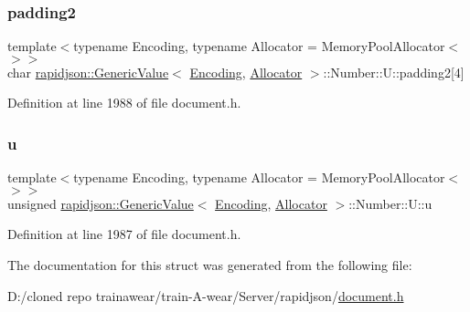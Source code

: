 \subsubsection{\texorpdfstring{padding2}{padding2}}
{\footnotesize\ttfamily template$<$typename Encoding, typename Allocator = Memory\+Pool\+Allocator$<$$>$$>$ \\
char \mbox{\hyperlink{classrapidjson_1_1_generic_value}{rapidjson\+::\+Generic\+Value}}$<$ \mbox{\hyperlink{classrapidjson_1_1_encoding}{Encoding}}, \mbox{\hyperlink{classrapidjson_1_1_allocator}{Allocator}} $>$\+::Number\+::\+U\+::padding2\mbox{[}4\mbox{]}}



Definition at line 1988 of file document.\+h.

\mbox{\label{structrapidjson_1_1_generic_value_1_1_number_1_1_u_aa624c2fe538411dd515dcfb0d72472b1}} 
\subsubsection{\texorpdfstring{u}{u}}
{\footnotesize\ttfamily template$<$typename Encoding, typename Allocator = Memory\+Pool\+Allocator$<$$>$$>$ \\
unsigned \mbox{\hyperlink{classrapidjson_1_1_generic_value}{rapidjson\+::\+Generic\+Value}}$<$ \mbox{\hyperlink{classrapidjson_1_1_encoding}{Encoding}}, \mbox{\hyperlink{classrapidjson_1_1_allocator}{Allocator}} $>$\+::Number\+::\+U\+::u}



Definition at line 1987 of file document.\+h.



The documentation for this struct was generated from the following file\+:\begin{DoxyCompactItemize}
\item 
D\+:/cloned repo trainawear/train-\/\+A-\/wear/\+Server/rapidjson/\mbox{\hyperlink{document_8h}{document.\+h}}\end{DoxyCompactItemize}
